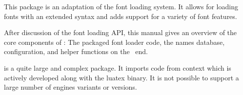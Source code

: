 
\beginfrontmatter


  \typesetdocumenttitle

  \beginabstractcontent
    This package is an adaptation of the \CONTEXT font loading system.
    It allows for loading \OpenType fonts with an extended syntax and adds
    support for a variety of font features.

    After discussion of the font loading API, this manual gives an
    overview of the core components of : The
    packaged font loader code, the names database, configuration, and
    helper functions on the \LUA\ end.
  \endabstractcontent

\endfrontmatter

\typesetcontent
{}
 is a quite large and complex package. It imports code from context which is actively developed along with the luatex binary. It is not possible
to support a large number of engines variants or versions.

